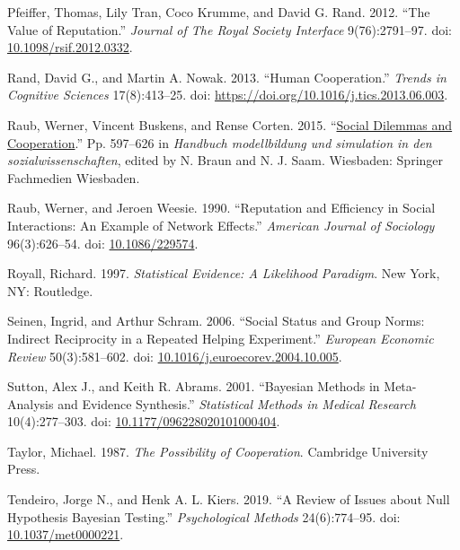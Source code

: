 \documentclass[
  11pt,
]{article}
\newlength{\cslhangindent}
\newlength{\cslentryspacingunit} %
\newenvironment{CSLReferences}[2] %
 {%
  \setlength{\parindent}{0pt}
  \ifodd #1
  \let\oldpar\par
  \def\par{\hangindent=\cslhangindent\oldpar}
  \fi
  \setlength{\parskip}{#2\cslentryspacingunit}
 }%
 {}
\begin{document}
\begin{CSLReferences}{1}{0}
\leavevmode{}%
Pfeiffer, Thomas, Lily Tran, Coco Krumme, and David G. Rand. 2012. {``The Value of Reputation.''} \emph{Journal of The Royal Society Interface} 9(76):2791--97. doi: \href{https://doi.org/10.1098/rsif.2012.0332}{10.1098/rsif.2012.0332}.

\leavevmode{}%
Rand, David G., and Martin A. Nowak. 2013. {``Human Cooperation.''} \emph{Trends in Cognitive Sciences} 17(8):413--25. doi: \url{https://doi.org/10.1016/j.tics.2013.06.003}.

\leavevmode{}%
Raub, Werner, Vincent Buskens, and Rense Corten. 2015. {``\href{https://doi.org/10.1007/978-3-658-01164-2_21}{Social Dilemmas and Cooperation}.''} Pp. 597--626 in \emph{Handbuch modellbildung und simulation in den sozialwissenschaften}, edited by N. Braun and N. J. Saam. Wiesbaden: Springer Fachmedien Wiesbaden.

\leavevmode{}%
Raub, Werner, and Jeroen Weesie. 1990. {``Reputation and Efficiency in Social Interactions: An Example of Network Effects.''} \emph{American Journal of Sociology} 96(3):626--54. doi: \href{https://doi.org/10.1086/229574}{10.1086/229574}.

\leavevmode{}%
Royall, Richard. 1997. \emph{{S}tatistical {E}vidence: A {L}ikelihood {P}aradigm}. New York, NY: Routledge.

\leavevmode{}%
Seinen, Ingrid, and Arthur Schram. 2006. {``Social Status and Group Norms: Indirect Reciprocity in a Repeated Helping Experiment.''} \emph{European Economic Review} 50(3):581--602. doi: \href{https://doi.org/10.1016/j.euroecorev.2004.10.005}{10.1016/j.euroecorev.2004.10.005}.

\leavevmode{}%
Sutton, Alex J., and Keith R. Abrams. 2001. {``Bayesian Methods in Meta-Analysis and Evidence Synthesis.''} \emph{Statistical Methods in Medical Research} 10(4):277--303. doi: \href{https://doi.org/10.1177/096228020101000404}{10.1177/096228020101000404}.

\leavevmode{}%
Taylor, Michael. 1987. \emph{The Possibility of Cooperation}. Cambridge University Press.

\leavevmode{}%
Tendeiro, Jorge N., and Henk A. L. Kiers. 2019. {``A Review of Issues about Null Hypothesis Bayesian Testing.''} \emph{Psychological Methods} 24(6):774--95. doi: \href{https://doi.org/10.1037/met0000221}{10.1037/met0000221}.


\end{CSLReferences}
\end{document}
